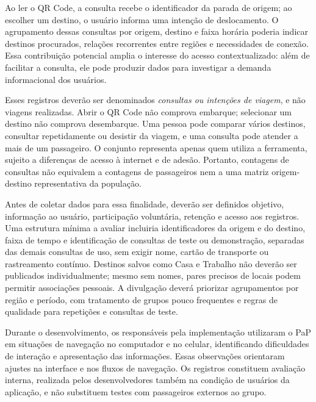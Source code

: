 \documentclass[12pt,oneside,a4paper,brazil,chapter=TITLE]{abntex2}
\begin{document}
Ao ler o QR Code, a consulta recebe o identificador da parada de origem; ao escolher um destino, o usuário informa uma intenção de deslocamento. O agrupamento dessas consultas por origem, destino e faixa horária poderia indicar destinos procurados, relações recorrentes entre regiões e necessidades de conexão. Essa contribuição potencial amplia o interesse do acesso contextualizado: além de facilitar a consulta, ele pode produzir dados para investigar a demanda informacional dos usuários.

Esses registros deverão ser denominados \textit{consultas ou intenções de viagem}, e não viagens realizadas. Abrir o QR Code não comprova embarque; selecionar um destino não comprova desembarque. Uma pessoa pode comparar vários destinos, consultar repetidamente ou desistir da viagem, e uma consulta pode atender a mais de um passageiro. O conjunto representa apenas quem utiliza a ferramenta, sujeito a diferenças de acesso à internet e de adesão. Portanto, contagens de consultas não equivalem a contagens de passageiros nem a uma matriz origem-destino representativa da população.

Antes de coletar dados para essa finalidade, deverão ser definidos objetivo, informação ao usuário, participação voluntária, retenção e acesso aos registros. Uma estrutura mínima a avaliar incluiria identificadores da origem e do destino, faixa de tempo e identificação de consultas de teste ou demonstração, separadas das demais consultas de uso, sem exigir nome, cartão de transporte ou rastreamento contínuo. Destinos salvos como Casa e Trabalho não deverão ser publicados individualmente; mesmo sem nomes, pares precisos de locais podem permitir associações pessoais. A divulgação deverá priorizar agrupamentos por região e período, com tratamento de grupos pouco frequentes e regras de qualidade para repetições e consultas de teste.

Durante o desenvolvimento, os responsáveis pela implementação utilizaram o PaP em situações de navegação no computador e no celular, identificando dificuldades de interação e apresentação das informações. Essas observações orientaram ajustes na interface e nos fluxos de navegação. Os registros constituem avaliação interna, realizada pelos desenvolvedores também na condição de usuários da aplicação, e não substituem testes com passageiros externos ao grupo.


\end{document}
